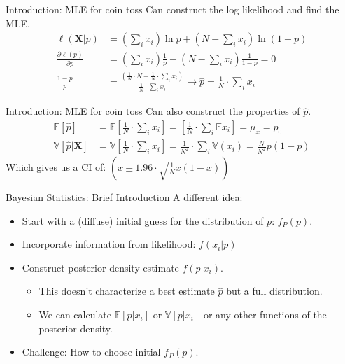 \documentclass[aspectratio=169]{beamer}
\begin{document}
\begin{frame}{Introduction: MLE for coin toss}
Can construct the \alert{log likelihood} and find the MLE.
\begin{align*}
\ell(\mathbf{X} | p) &= (\sum_i  x_i ) \ln p + (N-\sum_i x_i) \ln (1-p)\\
\frac{\partial \ell(p) }{\partial p} &= (\sum_i  x_i ) \frac{1}{p} - (N-\sum_i x_i) \frac{1}{1-p} =0\\
\frac{1-p}{p}  &= \frac{(\frac{1}{N}\cdot N-\frac{1}{N}\cdot\sum_i x_i) }{\frac{1}{N}\cdot \sum_i x_i} \rightarrow \hat{p} = \frac{1}{N}\cdot \sum_i x_i
\end{align*}
\end{frame}


\begin{frame}{Introduction: MLE for coin toss}
Can also construct the properties of $\hat{p}$.
\begin{align*}
\mathbb{E}[\hat{p}] &= \mathbb{E} \left[ \frac{1}{N}\cdot \sum_i x_i \right]  = \left[ \frac{1}{N}\cdot \sum_i \mathbb{E} x_i \right]  = \mu_x = p_0\\
\mathbb{V}[\hat{p} | \mathbf{X}] &= \mathbb{V} \left[ \frac{1}{N}\cdot \sum_i x_i \right]  =  \frac{1}{N^2}\cdot \sum_i \mathbb{V} (x_i ) = \frac{N}{N^2} p (1-p)
\end{align*}
Which gives us a CI of:  $\left(\overline{x} \pm 1.96 \cdot \sqrt{\frac{1}{N} \overline{x} (1-\overline{x})} \right)$
\end{frame}

\begin{frame}{Bayesian Statistics: Brief Introduction}
A different idea:
\begin{itemize}
\item Start with a (diffuse) initial guess for the distribution of $p$: $f_P(p)$.
\item Incorporate information from likelihood: $f(x_i | p)$
\item Construct \alert{posterior density} estimate $f(p | x_i)$.
\begin{itemize}
\item This doesn't characterize a best estimate $\hat{p}$ but a full distribution.
\item We can calculate $\mathbb{E}[p | x_i]$ or $\mathbb{V}[p |x_i]$ or any other functions of the posterior density.
\end{itemize}
\item Challenge: How to choose initial $f_P(p)$.
\end{itemize}
\end{frame}
\end{document}
